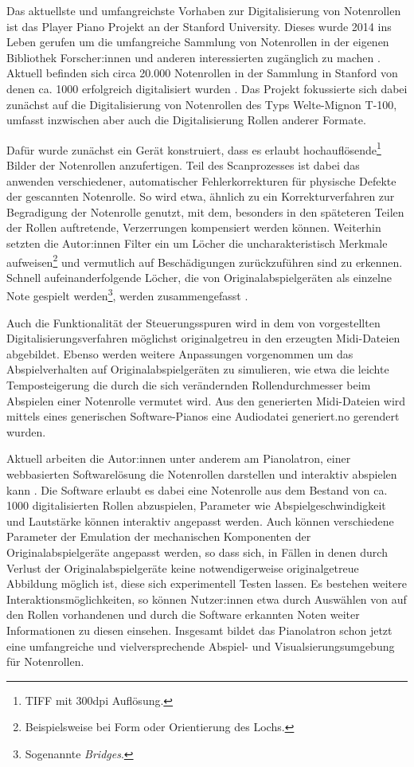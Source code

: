 Das aktuellste und umfangreichste Vorhaben zur Digitalisierung von Notenrollen ist das Player Piano Projekt an der Stanford University.
Dieses wurde 2014 ins Leben gerufen um die umfangreiche Sammlung von Notenrollen in der eigenen Bibliothek Forscher:innen und anderen interessierten zugänglich zu machen \autocite[]{shi_2019}.
Aktuell befinden sich circa 20.000 Notenrollen in der Sammlung in Stanford von denen ca. 1000 erfolgreich digitalisiert wurden \autocite[]{broadwell_2022}.
Das Projekt fokussierte sich dabei zunächst auf die Digitalisierung von Notenrollen des Typs Welte-Mignon T-100, umfasst inzwischen aber auch die Digitalisierung Rollen anderer Formate.

Dafür wurde zunächst ein Gerät konstruiert, dass es erlaubt hochauflösende\footnote{TIFF mit 300dpi Auflösung.} Bilder der Notenrollen anzufertigen.
Teil des Scanprozesses ist dabei das anwenden verschiedener, automatischer Fehlerkorrekturen für physische Defekte der gescannten Notenrolle.
So wird etwa, ähnlich zu \textcite[]{zoltan_1994} ein Korrekturverfahren zur Begradigung der Notenrolle genutzt, mit dem, besonders in den späteteren Teilen der Rollen auftretende, Verzerrungen kompensiert werden können.
Weiterhin setzten die Autor:innen Filter ein um Löcher die uncharakteristisch Merkmale aufweisen\footnote{Beispielsweise bei Form oder Orientierung des Lochs.} und vermutlich auf Beschädigungen zurückzuführen sind zu erkennen.
Schnell aufeinanderfolgende Löcher, die von Originalabspielgeräten als einzelne Note gespielt werden\footnote{Sogenannte \textit{Bridges}.}, werden zusammengefasst \autocite[519-520]{shi_2019}.

Auch die Funktionalität der Steuerungsspuren wird in dem von \textcite[521-522]{shi_2019} vorgestellten Digitalisierungsverfahren möglichst originalgetreu in den erzeugten Midi-Dateien abgebildet.
Ebenso werden weitere Anpassungen vorgenommen um das Abspielverhalten auf Originalabspielgeräten zu simulieren, wie etwa die leichte Temposteigerung die durch die sich verändernden Rollendurchmesser beim Abspielen einer Notenrolle vermutet wird.
Aus den generierten Midi-Dateien wird mittels eines generischen Software-Pianos eine Audiodatei generiert.no gerendert wurden.

Aktuell arbeiten die Autor:innen unter anderem am Pianolatron, einer webbasierten Softwarelösung die Notenrollen darstellen und interaktiv abspielen kann \parencite[]{vijoy_2022}.
Die Software erlaubt es dabei eine Notenrolle aus dem Bestand von ca. 1000 digitalisierten Rollen abzuspielen, Parameter wie Abspielgeschwindigkeit und Lautstärke können interaktiv angepasst werden.
Auch können verschiedene Parameter der Emulation der mechanischen Komponenten der Originalabspielgeräte angepasst werden, so dass sich, in Fällen in denen durch Verlust der Originalabspielgeräte keine notwendigerweise originalgetreue Abbildung möglich ist, diese sich experimentell Testen lassen.
Es bestehen weitere Interaktionsmöglichkeiten, so können Nutzer:innen etwa durch Auswählen von auf den Rollen vorhandenen und durch die Software erkannten Noten weiter Informationen zu diesen einsehen.
Insgesamt bildet das Pianolatron schon jetzt eine umfangreiche und vielversprechende Abspiel- und Visualsierungsumgebung für Notenrollen.

